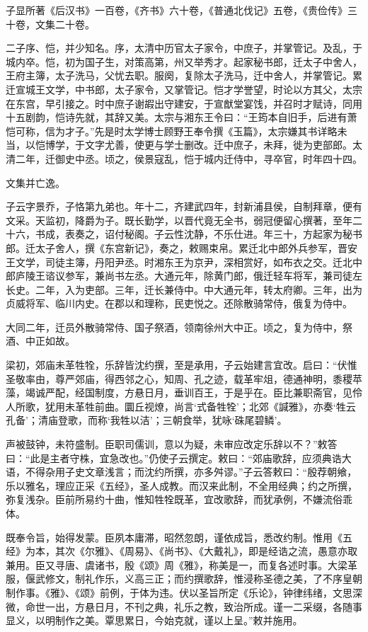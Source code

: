 \documentclass[12pt,UTF8]{ctexbook}
\begin{document}
子显所著《后汉书》一百卷，《齐书》六十卷，《普通北伐记》五卷，《贵俭传》三十卷，文集二十卷。

二子序、恺，并少知名。序，太清中历官太子家令，中庶子，并掌管记。及乱，于城内卒。恺，初为国子生，对策高第，州又举秀才。起家秘书郎，迁太子中舍人，王府主簿，太子洗马，父忧去职。服阕，复除太子洗马，迁中舍人，并掌管记。累迁宣城王文学，中书郎，太子家令，又掌管记。恺才学誉望，时论以方其父，太宗在东宫，早引接之。时中庶子谢嘏出守建安，于宣猷堂宴饯，并召时才赋诗，同用十五剧韵，恺诗先就，其辞又美。太宗与湘东王令曰：“王筠本自旧手，后进有萧恺可称，信为才子。”先是时太学博士顾野王奉令撰《玉篇》，太宗嫌其书详略未当，以恺博学，于文字尤善，使更与学士删改。迁中庶子，未拜，徙为吏部郎。太清二年，迁御史中丞。顷之，侯景寇乱，恺于城内迁侍中，寻卒官，时年四十四。

文集并亡逸。

子云字景乔，子恪第九弟也。年十二，齐建武四年，封新浦县侯，自制拜章，便有文采。天监初，降爵为子。既长勤学，以晋代竟无全书，弱冠便留心撰著，至年二十六，书成，表奏之，诏付秘阁。子云性沈静，不乐仕进。年三十，方起家为秘书郎。迁太子舍人，撰《东宫新记》，奏之，敕赐束帛。累迁北中郎外兵参军，晋安王文学，司徒主簿，丹阳尹丞。时湘东王为京尹，深相赏好，如布衣之交。迁北中郎庐陵王谘议参军，兼尚书左丞。大通元年，除黄门郎，俄迁轻车将军，兼司徒左长史。二年，入为吏部。三年，迁长兼侍中。中大通元年，转太府卿。三年，出为贞威将军、临川内史。在郡以和理称，民吏悦之。还除散骑常侍，俄复为侍中。

大同二年，迁员外散骑常侍、国子祭酒，领南徐州大中正。顷之，复为侍中，祭酒、中正如故。

梁初，郊庙未革牲牷，乐辞皆沈约撰，至是承用，子云始建言宜改。启曰：“伏惟圣敬率由，尊严郊庙，得西邻之心，知周、孔之迹，载革牢俎，德通神明，黍稷苹藻，竭诚严配，经国制度，方悬日月，垂训百王，于是乎在。臣比兼职斋官，见伶人所歌，犹用未革牲前曲。圜丘视燎，尚言‘式备牲牷’；北郊《諴雅》，亦奏‘牲云孔备’；清庙登歌，而称‘我牲以洁’；三朝食举，犹咏‘硃尾碧鳞’。

声被鼓钟，未符盛制。臣职司儒训，意以为疑，未审应改定乐辞以不？”敕答曰：“此是主者守株，宜急改也。”仍使子云撰定。敕曰：“郊庙歌辞，应须典诰大语，不得杂用子史文章浅言；而沈约所撰，亦多舛谬。”子云答敕曰：“殷荐朝飨，乐以雅名，理应正采《五经》，圣人成教。而汉来此制，不全用经典；约之所撰，弥复浅杂。臣前所易约十曲，惟知牲牷既革，宜改歌辞，而犹承例，不嫌流俗乖体。

既奉令旨，始得发蒙。臣夙本庸滞，昭然忽朗，谨依成旨，悉改约制。惟用《五经》为本，其次《尔雅》、《周易》、《尚书》、《大戴礼》，即是经诰之流，愚意亦取兼用。臣又寻唐、虞诸书，殷《颂》周《雅》，称美是一，而复各述时事。大梁革服，偃武修文，制礼作乐，义高三正；而约撰歌辞，惟浸称圣德之美，了不序皇朝制作事。《雅》、《颂》前例，于体为违。伏以圣旨所定《乐论》，钟律纬绪，文思深微，命世一出，方悬日月，不刊之典，礼乐之教，致治所成。谨一二采缀，各随事显义，以明制作之美。覃思累日，今始克就，谨以上呈。”敕并施用。
\end{document}
